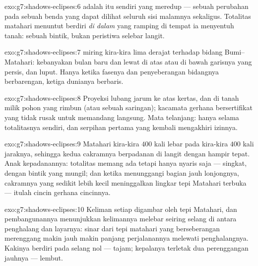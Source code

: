 \begin{solution}{exo:g7:shadows-eclipses:6}
 adalah  itu sendiri yang meredup --- sebuah
perubahan pada sebuah benda yang dapat dilihat seluruh sisi malamnya
sekaligus. Totalitas matahari menuntut berdiri \emph{di dalam} 
 yang ramping di tempat ia menyentuh tanah: sebuah bintik, bukan
peristiwa selebar langit.
\end{solution}

\begin{solution}{exo:g7:shadows-eclipses:7}
  miring kira-kira lima derajat terhadap bidang
Bumi--Matahari: kebanyakan bulan baru dan  lewat di atas
atau di bawah garisnya yang persis, dan  luput. Hanya
ketika fasenya dan penyeberangan bidangnya berbarengan, ketiga
dunianya berbaris.
\end{solution}

\begin{solution}{exo:g7:shadows-eclipses:8}
Proyeksi lubang jarum ke atas kertas, dan  di tanah milik pohon
yang rimbun (atau sebuah saringan); kacamata gerhana bersertifikat
yang tidak rusak untuk memandang langsung. Mata telanjang: hanya
selama totalitasnya sendiri, dan serpihan pertama yang kembali
mengakhiri izinnya.
\end{solution}

\begin{solution}{exo:g7:shadows-eclipses:9}
Matahari kira-kira $400$ kali lebar  pada kira-kira $400$ kali
jaraknya, sehingga kedua cakramnya berpadanan di langit dengan hampir
tepat. Anak kepadanannya: totalitas memang ada tetapi hanya nyaris
saja --- singkat, dengan bintik  yang mungil; dan ketika 
menunggangi bagian jauh  lonjongnya, cakramnya yang sedikit lebih
kecil meninggalkan lingkar tepi Matahari terbuka --- itulah cincin
gerhana cincinnya.
\end{solution}

\begin{solution}{exo:g7:shadows-eclipses:10}
Keliman  setiap  digambar oleh tepi Matahari, dan
pembangunannya menunjukkan kelimannya melebar seiring selang di antara
penghalang dan layarnya: sinar dari tepi matahari yang berseberangan
merenggang makin jauh makin panjang perjalanannya melewati
penghalangnya. Kakinya berdiri pada selang nol --- tajam;
 kepalanya terletak dua  perenggangan jauhnya ---
lembut.
\end{solution}

